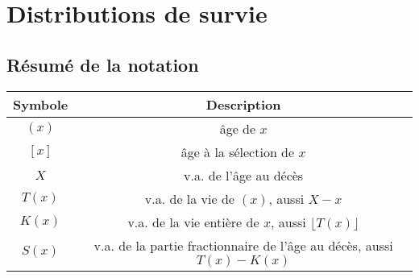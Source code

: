 \chapter{Distributions de survie}

\section{Résumé de la notation}

\begin{center}
	\begin{tabular}{cc}
		\hline
		Symbole &                              Description                               \\ \hline
		$(x)$  &                               âge de $x$                               \\
		$[x]$  &                       âge à la sélection de $x$                        \\
		$X$   &                         v.a. de l'âge au décès                         \\
		$T(x)$  &                 v.a. de la vie de $(x)$, aussi $X - x$                 \\
		$K(x)$  &      v.a. de la vie entière de $x$, aussi $\lfloor T(x) \rfloor$       \\
		$S(x)$  & v.a. de la partie fractionnaire de l'âge au décès, aussi $T(x) - K(x)$ \\ \hline
	\end{tabular}
\end{center}

